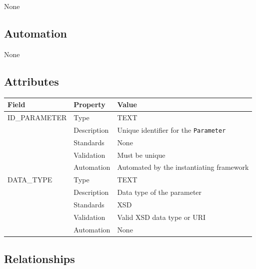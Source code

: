 \documentclass[
]{article}
\newcounter{none} %
\begin{document}
None

\subsection{Automation}\label{automation-21}

None

\subsection{Attributes}\label{attributes-18}

{\def\LTcaptype{none} %
\begin{longtable}[]{@{}lll@{}}
\toprule\noalign{}
Field & Property & Value \\
\midrule\noalign{}
\endhead
\bottomrule\noalign{}
\endlastfoot
ID\_PARAMETER & Type & TEXT \\
& Description & Unique identifier for the \texttt{Parameter} \\
& Standards & None \\
& Validation & Must be unique \\
& Automation & Automated by the instantiating framework \\
DATA\_TYPE & Type & TEXT \\
& Description & Data type of the parameter \\
& Standards & XSD \\
& Validation & Valid XSD data type or URI \\
& Automation & None \\
\end{longtable}
}

\subsection{Relationships}\label{relationships-17}
\end{document}
